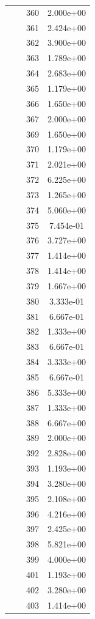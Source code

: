 \documentclass[12pt]{article}
\begin{document}
\begin{longtable}{@{}cccc@{}}
 &  & 360 & 2.000e+00 \\
 &  & 361 & 2.424e+00 \\
 &  & 362 & 3.900e+00 \\
 &  & 363 & 1.789e+00 \\
 &  & 364 & 2.683e+00 \\
 &  & 365 & 1.179e+00 \\
 &  & 366 & 1.650e+00 \\
 &  & 367 & 2.000e+00 \\
 &  & 369 & 1.650e+00 \\
 &  & 370 & 1.179e+00 \\
 &  & 371 & 2.021e+00 \\
 &  & 372 & 6.225e+00 \\
 &  & 373 & 1.265e+00 \\
 &  & 374 & 5.060e+00 \\
 &  & 375 & 7.454e-01 \\
 &  & 376 & 3.727e+00 \\
 &  & 377 & 1.414e+00 \\
 &  & 378 & 1.414e+00 \\
 &  & 379 & 1.667e+00 \\
 &  & 380 & 3.333e-01 \\
 &  & 381 & 6.667e-01 \\
 &  & 382 & 1.333e+00 \\
 &  & 383 & 6.667e-01 \\
 &  & 384 & 3.333e+00 \\
 &  & 385 & 6.667e-01 \\
 &  & 386 & 5.333e+00 \\
 &  & 387 & 1.333e+00 \\
 &  & 388 & 6.667e+00 \\
 &  & 389 & 2.000e+00 \\
 &  & 392 & 2.828e+00 \\
 &  & 393 & 1.193e+00 \\
 &  & 394 & 3.280e+00 \\
 &  & 395 & 2.108e+00 \\
 &  & 396 & 4.216e+00 \\
 &  & 397 & 2.425e+00 \\
 &  & 398 & 5.821e+00 \\
 &  & 399 & 4.000e+00 \\
 &  & 401 & 1.193e+00 \\
 &  & 402 & 3.280e+00 \\
 &  & 403 & 1.414e+00 \\

\end{longtable}
\end{document}
